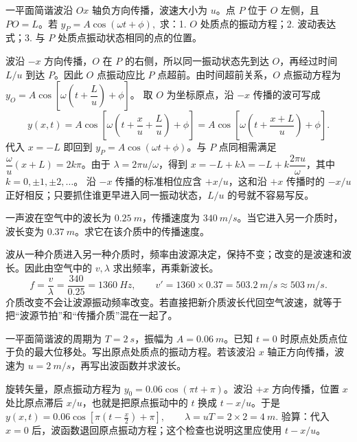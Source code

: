 \begin{exercise}
一平面简谐波沿 \(Ox\) 轴负方向传播，波速大小为 \(u\)。点 \(P\) 位于 \(O\) 左侧，且 \(PO=L\)。若
 \(y_P=A\cos(\omega t+\phi),\) 
求：1. \(O\) 处质点的振动方程；2. 波动表达式；3. 与 \(P\) 处质点振动状态相同的点的位置。
\end{exercise}

\begin{solution}
波沿 \(-x\) 方向传播，\(O\) 在 \(P\) 的右侧，所以同一振动状态先到达 \(O\)，再经过时间 \(L/u\) 到达 \(P\)。因此 \(O\) 点振动应比 \(P\) 点超前。由时间超前关系，\(O\) 点振动方程为 \(y_O=A\cos\left[\omega\left(t+\dfrac{L}{u}\right)+\phi\right]\)。
取 \(O\) 为坐标原点，沿 \(-x\) 传播的波可写成
\[
y(x,t)=A\cos\left[\omega\left(t+\frac{x}{u}+\frac{L}{u}\right)+\phi\right]
=A\cos\left[\omega\left(t+\frac{x+L}{u}\right)+\phi\right].
\]
代入 \(x=-L\) 即回到 \(y_P=A\cos(\omega t+\phi)\)。与 \(P\) 点同相需满足 \(\dfrac{\omega}{u}(x+L)=2k\pi\)。由于 \(\lambda=2\pi u/\omega\)，得到 \(x=-L+k\lambda=-L+k\dfrac{2\pi u}{\omega}\)，其中 \(k=0,\pm1,\pm2,\dots\)。
沿 \(-x\) 传播的标准相位应含 \(+x/u\)，这和沿 \(+x\) 传播时的 \(-x/u\) 正好相反；只要抓住谁更早进入同一振动状态，\(L/u\) 的号就不容易写反。
\end{solution}

\begin{exercise}
一声波在空气中的波长为 \(\SI{0.25}{m}\)，传播速度为 \(\SI{340}{m/s}\)。当它进入另一介质时，波长变为 \(\SI{0.37}{m}\)。求它在该介质中的传播速度。
\end{exercise}

\begin{solution}
波从一种介质进入另一种介质时，频率由波源决定，保持不变；改变的是波速和波长。因此由空气中的 \(v,\lambda\) 求出频率，再乘新波长。
\[
f=\frac{v}{\lambda}=\frac{340}{0.25}=\SI{1360}{Hz},\qquad
v'=1360\times0.37=\SI{503.2}{m/s}\approx\SI{503}{m/s}.
\]
介质改变不会让波源振动频率改变。若直接把新介质波长代回空气波速，就等于把“波源节拍”和“传播介质”混在一起了。
\end{solution}

\begin{exercise}
一平面简谐波的周期为 \(T=\SI{2}{s}\)，振幅为 \(A=\SI{0.06}{m}\)。已知 \(t=0\) 时原点处质点位于负的最大位移处。写出原点处质点的振动方程。若该波沿 \(x\) 轴正方向传播，波速为 \(u=\SI{2}{m/s}\)，再写出波函数并求波长。
\end{exercise}
\begin{solution}
旋转矢量，原点振动方程为 \(y_0=0.06\cos(\pi t+\pi)\)。波沿 \(+x\) 方向传播，位置 \(x\) 处比原点滞后 \(x/u\)，也就是把原点振动中的 \(t\) 换成 \(t-x/u\)。于是
 \(y(x,t)=0.06\cos\left[\pi\left(t-\frac{x}{2}\right)+\pi\right], \qquad \lambda=uT=2\times2=\SI{4}{m}.\) 
验算：代入 \(x=0\) 后，波函数退回原点振动方程；这个检查也说明这里应使用 \(t-x/u\)。
\end{solution}

